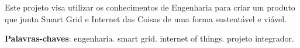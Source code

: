 \begin{resumo}
Este projeto visa utilizar os conhecimentos de Engenharia para criar um produto que junta Smart Grid e Internet das Coisas de uma forma sustentável e viável.

 \vspace{\onelineskip}
    
 \noindent
 \textbf{Palavras-chaves}: engenharia. smart grid. internet of things. projeto integrador.
\end{resumo}
